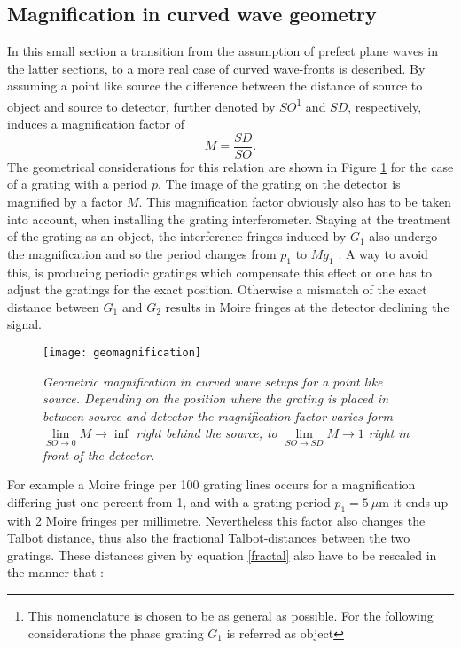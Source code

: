 \subsection{Magnification in curved wave geometry}\label{subsec:mag}
In this small section a transition from the assumption of prefect plane waves in the latter sections, to a more real case of curved wave-fronts is described. By assuming a point like source the difference between the distance of source to object and source to detector, further denoted by $SO$\footnote{This nomenclature is chosen to be as general as possible. For the following considerations the phase grating $G_{1}$ is referred as object} and $SD$, respectively, induces a magnification factor of 
\begin{equation}\label{magnification}
M = \frac{SD}{SO}.
\end{equation}
The geometrical considerations for this relation are shown in Figure \ref{geomag} for the case of a grating with a period $p$. The image of the grating on the detector is magnified by a factor $M$. This magnification factor obviously also has to be taken into account, when installing the grating interferometer. Staying at the treatment of the grating as an object, the interference fringes induced by $G_{1}$ also undergo the magnification and so the period changes from $p_{1}$ to $Mg_{1}$ \citep{Bech2009}. A way to avoid this, is producing periodic gratings which compensate this effect or one has to adjust the gratings for the exact position. Otherwise a mismatch of the exact distance between $G_{1}$ and $G_{2}$ results in Moire fringes at the detector declining the signal.
\begin{figure}[h]
	\begin{center}
		\texttt{[image: geomagnification]}
	\end{center}
	\caption[Geometric magnification in curved wave setups]{\textit{Geometric magnification in curved wave setups for a point like source. Depending on the position where the grating is placed in between source and detector the magnification factor varies form $\lim\limits_{SO \rightarrow 0}{M \rightarrow \inf}$ right behind the source, to $\lim\limits_{SO \rightarrow SD}{M \rightarrow 1}$ right in front of the detector.}}
	\label{geomag}
\end{figure}
For example a Moire fringe per 100 grating lines occurs for a magnification differing just one percent from 1, and with a grating period $p_{1} = 5\ \mu$m it ends up with 2 Moire fringes per millimetre. Nevertheless this factor also changes the Talbot distance, thus also the fractional Talbot-distances between the two gratings. These distances given by equation \ref{fractal} also have to be rescaled in the manner that \citep{Bech2009}:
